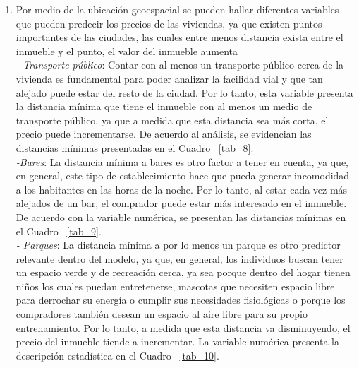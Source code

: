 \documentclass[conference, 10pt]{IEEEtran}
\begin{document}
\begin{enumerate}
\item	Por medio de la ubicación geoespacial se pueden hallar diferentes variables que pueden predecir los precios de las viviendas, ya que existen puntos importantes de las ciudades, las cuales entre menos distancia exista entre el inmueble y el punto, el valor del inmueble aumenta\\
-\textit{	Transporte público}: Contar con al menos un transporte público cerca de la vivienda es fundamental para poder analizar la facilidad vial y que tan alejado puede estar del resto de la ciudad. Por lo tanto, esta variable presenta la distancia mínima que tiene el inmueble con al menos un medio de transporte público, ya que a medida que esta distancia sea más corta, el precio puede incrementarse. De acuerdo al análisis, se evidencian las distancias mínimas presentadas en el Cuadro ~\ref{tab_8}.\\
\textit{-Bares}: La distancia mínima a bares es otro factor a tener en cuenta, ya que, en general, este tipo de establecimiento hace que pueda generar incomodidad a los habitantes en las horas de la noche. Por lo tanto, al estar cada vez más alejados de un bar, el comprador puede estar más interesado en el inmueble. De acuerdo con la variable numérica, se presentan las distancias mínimas en el Cuadro ~\ref{tab_9}.\\
\textit{-	Parques}: La distancia mínima a por lo menos un parque es otro predictor relevante dentro del modelo, ya que, en general, los individuos buscan tener un espacio verde y de recreación cerca, ya sea porque dentro del hogar tienen niños los cuales puedan entretenerse, mascotas que necesiten espacio libre para derrochar su energía o cumplir sus necesidades fisiológicas o porque los compradores también desean un espacio al aire libre para su propio entrenamiento. Por lo tanto, a medida que esta distancia va disminuyendo, el precio del inmueble tiende a incrementar. La variable numérica presenta la descripción estadística en el Cuadro ~\ref{tab_10}.
\end{enumerate}
\end{document}
